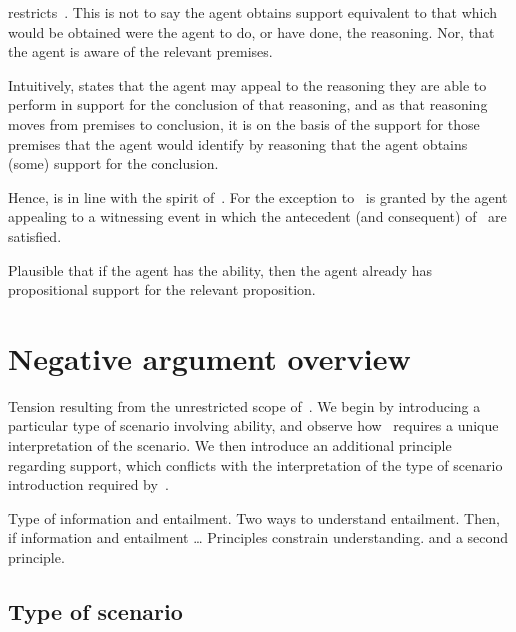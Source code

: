 \begin{note}[Alternative]
  \rC{} restricts~\uRa{}.
  This is not to say the agent obtains support equivalent to that which would be obtained were the agent to do, or have done, the reasoning.
  Nor, that the agent is aware of the relevant premises.

  Intuitively, \rC{} states that the agent may appeal to the reasoning they are able to perform in support for the conclusion of that reasoning, and as that reasoning moves from premises to conclusion, it is on the basis of the support for those premises that the agent would identify by reasoning that the agent obtains (some) support for the conclusion.

  Hence, \rC{} is in line with the spirit of~\bP{}.
  For the exception to~\uRa{} is granted by the agent appealing to a witnessing event in which the antecedent (and consequent) of~\bP{} are satisfied.
\end{note}

\begin{note}
  Plausible that if the agent has the ability, then the agent already has propositional support for the relevant proposition.
\end{note}

\section{Negative argument overview}
\label{sec:broad-argum-overv}

\begin{note}[Overview]
  Tension resulting from the unrestricted scope of~\uRa{}.
  We begin by introducing a particular type of scenario involving ability, and observe how~\uRa{} requires a unique interpretation of the scenario.
  We then introduce an additional principle regarding support, which conflicts with the interpretation of the type of scenario introduction required by~\uRa{}.
\end{note}

\begin{note}
  Type of information and entailment.
  Two ways to understand entailment.
  Then, if information and entailment \dots
  Principles constrain understanding.
  \uRa{} and a second principle.
\end{note}

\subsection{Type of scenario}
\label{sec:type-scenario}

